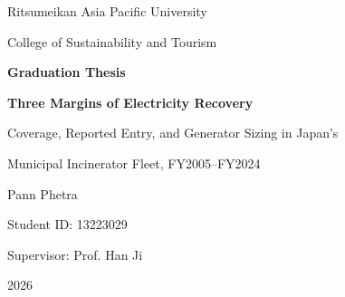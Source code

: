 \documentclass[12pt,a4paper]{article}
\begin{document}

\begin{titlepage}
\thispagestyle{empty}
\begin{center}
\vspace*{1.2cm}
{\Large Ritsumeikan Asia Pacific University\par}
\vspace{0.35cm}
{\large College of Sustainability and Tourism\par}
\vspace{1.1cm}
{\Large\bfseries Graduation Thesis\par}

\vfill

{\LARGE\bfseries Three Margins of Electricity Recovery\par}
\vspace{0.45cm}
{\Large Coverage, Reported Entry, and Generator Sizing in Japan's\par}
\vspace{0.15cm}
{\Large Municipal Incinerator Fleet, FY2005--FY2024\par}

\vfill

{\large Pann Phetra\par}
\vspace{0.4cm}
{\large Student ID: 13223029\par}
\vspace{0.4cm}
{\large Supervisor: Prof. Han Ji\par}

\vfill

{\large 2026\par}
\end{center}
\end{titlepage}

\clearpage
{}
\end{document}
